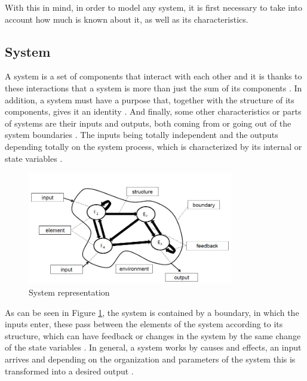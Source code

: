 \documentclass{article}
\begin{document}
\begin{doublespacing}
\par With this in mind, in order to model any system, it is first necessary to take into account how much is known about it, as well as its characteristics. 
 

\subsection{System} 
{
\par A system is a set of components that interact with each other and it is thanks to these interactions that a system is more than just the sum of its components \cite{kaestner:basics}. In addition, a system must have a purpose that, together with the structure of its components, gives it an identity \cite{kaestner:basics}. And finally, some other characteristics or parts of systems are their inputs and outputs, both coming from or going out of the system boundaries \cite{kaestner:basics}. The inputs being totally independent and the outputs depending totally on the system process, which is characterized by its internal or state variables \cite{kaestner:basics}. 

\begin{figure}[H] 
    \centering
    \includegraphics[width=0.8\textwidth]{Images/Partes_del_sistema.JPG} 
    \caption{System representation \cite{kaestner:basics}} 
    \label{fig:SystemParts} 
\end{figure}

\par As can be seen in Figure \ref{fig:SystemParts}, the system is contained by a boundary, in which the inputs enter, these pass between the elements of the system according to its structure, which can have feedback or changes in the system by the same change of the state variables \cite{kaestner:basics}. In general, a system works by causes and effects, an input arrives and depending on the organization and parameters of the system this is transformed into a desired output \cite{kaestner:basics}. 
}



\end{doublespacing}
\end{document}
